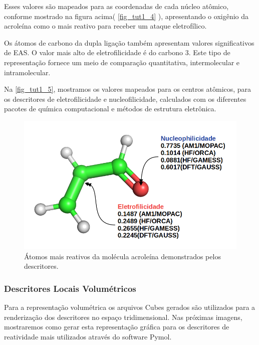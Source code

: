 \documentclass[a4paper,11pt]{refart}
\begin{document}
Esses valores são mapeados para as coordenadas de cada núcleo atômico, conforme mostrado na figura acima( \autoref{fig_tut1_4} ), apresentando o oxigênio da acroleína como o mais reativo para receber um ataque eletrofílico.

Os átomos de carbono da dupla ligação também apresentam valores significativos de EAS. O valor mais alto de eletrofilicidade é do carbono 3. Este tipo de representação fornece um meio de comparação quantitativa, intermolecular e intramolecular. 

Na \autoref{fig_tut1_5}, mostramos os valores mapeados para os centros atômicos, para os descritores de eletrofilicidade e nucleofilicidade, calculados com os diferentes pacotes de química computacional e métodos de estrutura eletrônica. 

\hspace*{-\leftmarginwidth}
\begin{minipage}{\fullwidth}
\begin{figure}[H]
\begin{center}
\includegraphics[width=4.5in]{images/img6}
\caption{Átomos mais reativos da molécula acroleína demonstrados pelos descritores.}
\label{fig_tut1_5}
\end{center}
\end{figure}
\end{minipage}


\subsubsection{Descritores Locais Volumétricos}

Para a representação volumétrica os arquivos Cubes gerados são utilizados para a renderização dos descritores no espaço tridimensional. Nas próximas imagens, mostraremos como gerar esta representação gráfica para os descritores de reatividade mais utilizados através do software Pymol. 
\end{document}
